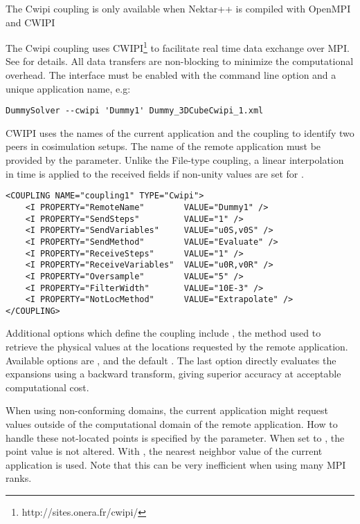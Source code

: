 \begin{notebox}
    The Cwipi coupling is only available when Nektar++ is compiled with OpenMPI and CWIPI
\end{notebox}
The Cwipi coupling uses CWIPI\footnote{http://sites.onera.fr/cwipi/} to facilitate real time data exchange over MPI.
See \cite{La18} for details.
All data transfers are non-blocking to minimize the computational overhead.
The interface must be enabled with the command line option  and a unique application name, e.g:\begin{lstlisting}[style=BashInputStyle] 
DummySolver --cwipi 'Dummy1' Dummy_3DCubeCwipi_1.xml
\end{lstlisting}
CWIPI uses the names of the current application and the coupling to identify two peers in cosimulation setups.
The name of the remote application must be provided by the  parameter.
Unlike the File-type coupling, a linear interpolation in time is applied to the received fields if non-unity values are set for .
\begin{lstlisting}[style=XMLStyle] 
<COUPLING NAME="coupling1" TYPE="Cwipi">
    <I PROPERTY="RemoteName"        VALUE="Dummy1" />
    <I PROPERTY="SendSteps"         VALUE="1" />
    <I PROPERTY="SendVariables"     VALUE="u0S,v0S" />
    <I PROPERTY="SendMethod"        VALUE="Evaluate" />
    <I PROPERTY="ReceiveSteps"      VALUE="1" />
    <I PROPERTY="ReceiveVariables"  VALUE="u0R,v0R" />
    <I PROPERTY="Oversample"        VALUE="5" />
    <I PROPERTY="FilterWidth"       VALUE="10E-3" />
    <I PROPERTY="NotLocMethod"      VALUE="Extrapolate" />
</COUPLING>
\end{lstlisting}

Additional options which define the coupling include , the method used to retrieve the physical values at the locations requested by the remote application.
Available options are ,  and the default .
The last option directly evaluates the expansions using a backward transform, giving superior accuracy at acceptable computational cost.

When using non-conforming domains, the current application might request values outside of the computational domain of the remote application.
How to handle these not-located points is specified by the  parameter.
When set to , the point value is not altered.
With , the nearest neighbor value of the current application is used.
Note that this can be very inefficient when using many MPI ranks.


